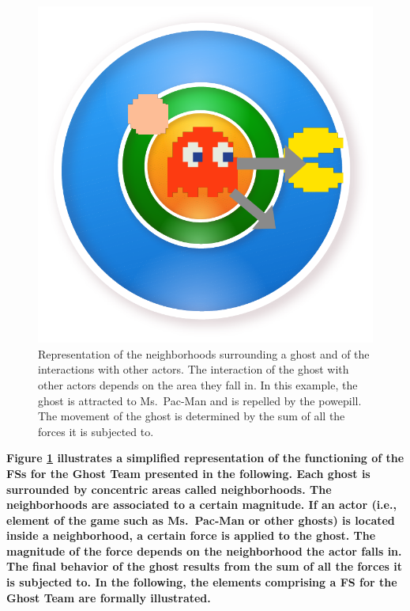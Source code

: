 \documentclass[journal]{IEEEtran}
\begin{document}
\begin{figure}[!t]
  \caption{Representation of the neighborhoods surrounding a ghost and of the interactions with other actors. The interaction of the ghost with other actors depends on the area they fall in. In this example, the ghost is attracted to Ms.\ Pac-Man and is repelled by the powepill. The movement of the ghost is determined by the sum of all the forces it is subjected to.}
  \label{fig:Neigh_interaction}
  \centering
  \includegraphics[scale=0.5]{"neigh_inter"}
\end{figure}

\textbf{Figure \ref{fig:Neigh_interaction} illustrates a simplified representation of the functioning of the FSs for the Ghost Team presented in the following. Each ghost is surrounded by concentric areas called neighborhoods. The neighborhoods are associated to a certain magnitude. If an actor (i.e., element of the game such as Ms.\ Pac-Man or other ghosts) is located inside a neighborhood, a certain force is applied to the ghost. The magnitude of the force depends on the neighborhood the actor falls in. The final behavior of the ghost results from the sum of all the forces it is subjected to. In the following, the elements comprising a FS for the Ghost Team are formally illustrated.}
\end{document}

